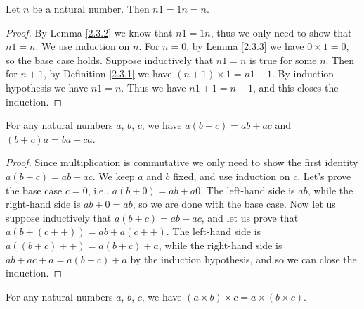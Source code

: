 \begin{additional corollary}\label{ac 2.3.4}
Let \(n\) be a natural number.
Then \(n1 = 1n = n\).
\end{additional corollary}

\begin{proof}
    By Lemma \ref{2.3.2} we know that \(n1 = 1n\), thus we only need to show that \(n1 = n\).
    We use induction on \(n\).
    For \(n=0\), by Lemma \ref{2.3.3} we have \(0 \times 1 = 0\), so the base case holds.
    Suppose inductively that \(n1 = n\) is true for some \(n\).
    Then for \(n + 1\), by Definition \ref{2.3.1} we have \((n + 1) \times 1 = n1 + 1\).
    By induction hypothesis we have \(n1 = n\).
    Thus we have \(n1 + 1 = n + 1\), and this closes the induction.
\end{proof}

\begin{proposition}\label{2.3.4}
    For any natural numbers \(a\), \(b\), \(c\), we have \(a(b + c) = ab + ac\) and \((b + c)a = ba + ca\).
\end{proposition}

\begin{proof}
    Since multiplication is commutative we only need to show the first identity \(a(b + c) = ab + ac\).
    We keep \(a\) and \(b\) fixed, and use induction on \(c\).
    Let’s prove the base case \(c = 0\), i.e., \(a(b + 0) = ab + a0\).
    The left-hand side is \(ab\), while the right-hand side is \(ab + 0 = ab\), so we are done with the base case.
    Now let us suppose inductively that \(a(b + c) = ab + ac\), and let us prove that \(a(b + (c++)) = ab + a(c++)\).
    The left-hand side is \(a((b + c)++) = a(b + c) + a\), while the right-hand side is \(ab + ac + a = a(b + c) + a\) by the induction hypothesis, and so we can close the induction.
\end{proof}

\begin{proposition}\label{2.3.5}
    For any natural numbers \(a\), \(b\), \(c\), we have \((a \times b) \times c = a \times (b \times c)\).
\end{proposition}

